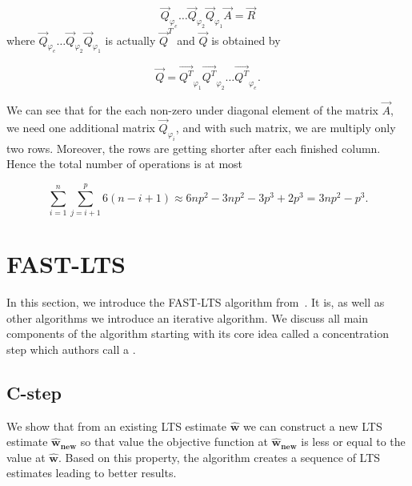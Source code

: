 \begin{equation}
    \vec{Q}_{\varphi_e}\ldots\vec{Q}_{\varphi_2}\vec{Q}_{\varphi_1}\vec{A} = \vec{R}
\end{equation}
where $\vec{Q}_{\varphi_e}\ldots\vec{Q}_{\varphi_2}\vec{Q}_{\varphi_1}$ is actually $\vec{Q}^T$ and $\vec{Q}$ is obtained by 

\begin{equation}
 \vec{Q} = \vec{Q^T}_{\varphi_1}\vec{Q^T}_{\varphi_2}\ldots\vec{Q^T}_{\varphi_e}.
\end{equation}

We can see that for the each non-zero under diagonal element of the matrix $\vec{A}$, we need one additional matrix $\vec{Q}_{\varphi_i}$, and with such matrix, we are multiply only two rows. Moreover, the rows are getting shorter after each finished column. Hence the total number of operations is at most

\begin{equation}
    \sum\limits_{i=1}^n  \sum\limits_{j=i+1}^p 6(n-i+1) \approx 6np^2 - 3np^2 - 3p^3 + 2p^3 = 3np^2 - p^3.
\end{equation}

















\section{FAST-LTS} \label{section_fast_lts}
In this section, we introduce the FAST-LTS algorithm from~\cite{rouss:2000}. 
It is, as well as other algorithms we introduce an iterative algorithm. We discuss all main components of the algorithm starting with its core idea called a concentration step which authors call a .

\subsection{C-step}
We show that from an existing LTS estimate $\boldsymbol{\hat{w}}$ we can construct a new LTS estimate $\boldsymbol{\hat{w}_{new}}$ so that value the objective function at $\boldsymbol{\hat{w}_{new}}$ is less or equal to the value at $\boldsymbol{\hat{w}}$. Based on this property, the algorithm creates a sequence of LTS estimates leading to better results.


